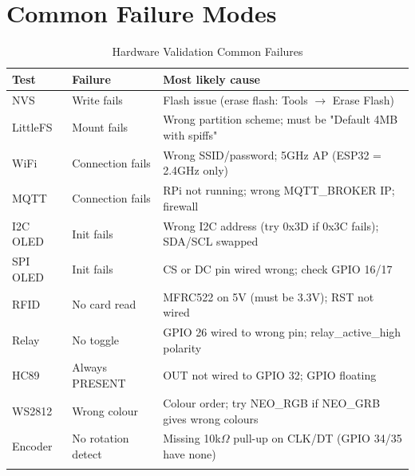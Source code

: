 \section{Common Failure Modes}

\begin{longtable}{L{3cm}L{4.5cm}L{7cm}}
\toprule
\textbf{Test} & \textbf{Failure} & \textbf{Most likely cause} \\
\midrule
\endhead
NVS & Write fails & Flash issue (erase flash: Tools $\rightarrow$ Erase Flash) \\
LittleFS & Mount fails & Wrong partition scheme; must be "Default 4MB with spiffs" \\
WiFi & Connection fails & Wrong SSID/password; 5GHz AP (ESP32 = 2.4GHz only) \\
MQTT & Connection fails & RPi not running; wrong MQTT\_BROKER IP; firewall \\
I2C OLED & Init fails & Wrong I2C address (try 0x3D if 0x3C fails); SDA/SCL swapped \\
SPI OLED & Init fails & CS or DC pin wired wrong; check GPIO 16/17 \\
RFID & No card read & MFRC522 on 5V (must be 3.3V); RST not wired \\
Relay & No toggle & GPIO 26 wired to wrong pin; relay\_active\_high polarity \\
HC89 & Always PRESENT & OUT not wired to GPIO 32; GPIO floating \\
WS2812 & Wrong colour & Colour order; try NEO\_RGB if NEO\_GRB gives wrong colours \\
Encoder & No rotation detect & Missing 10k$\Omega$ pull-up on CLK/DT (GPIO 34/35 have none) \\
\bottomrule
\caption{Hardware Validation Common Failures}
\end{longtable}
